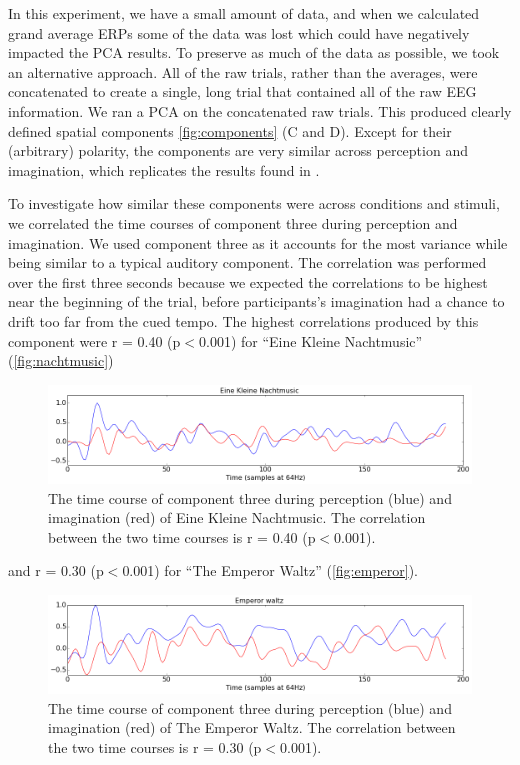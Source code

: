 In this experiment, we have a small amount of data, and when we calculated grand average \acp{ERP} some of the data was lost which could have negatively impacted the \ac{PCA} results.
To preserve as much of the data as possible, we took an alternative approach. 
All of the raw trials, rather than the averages, were concatenated to create a single, long trial that contained all of the raw EEG information.
We ran a \ac{PCA} on the concatenated raw trials. 
This produced clearly defined spatial components \autoref{fig:components} (C and D).
Except for their (arbitrary) polarity, the components are very similar across perception and imagination, which replicates the results found in \cite{schaefer_name_2011}.

To investigate how similar these components were across conditions and stimuli, we correlated the time courses of component three during perception and imagination.
We used component three as it accounts for the most variance while being similar to a typical auditory component.
The correlation was performed over the first three seconds because we expected the correlations to be highest near the beginning of the trial, before participants's imagination had a chance to drift too far from the cued tempo.
The highest correlations produced by this component were r = 0.40 (p$<$0.001) for ``Eine Kleine Nachtmusic'' (\autoref{fig:nachtmusic})
\begin{figure}[htbp]
  \centerline{\includegraphics[scale=0.4]{Figures/EineKleineCorrelation}}
  \caption{The time course of component three during perception (blue) and imagination (red) of Eine Kleine Nachtmusic. The correlation between the two time courses is r = 0.40 (p$<$0.001).}
  \label{fig:nachtmusic}
\end{figure}
and r = 0.30 (p$<$0.001) for ``The Emperor Waltz'' (\autoref{fig:emperor}).
\begin{figure}[htbp]
  \centerline{\includegraphics[scale=0.4]{Figures/EmperorCorrelation}}
  \caption{The time course of component three during perception (blue) and imagination (red) of The Emperor Waltz. The correlation between the two time courses is r = 0.30 (p$<$0.001).}
  \label{fig:emperor}
\end{figure}
